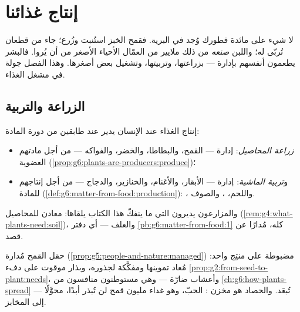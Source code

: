 \chapter{إنتاج غذائنا}\label{ch:g6:producing-our-food}

لا شيء على مائدة فطورك وُجد في البرية. فقمح الخبز استُنبت وزُرع؛
 جاء من قطعان تُربّى له؛ واللبن \emph{صنعه} من ذلك 
ملايير من العمّال الأحياء الأصغر من أن يُروا. فالبشر يطعمون أنفسهم
بإدارة  --- بزراعتها، وتربيتها، وتشغيل بعض أصغرها.
وهذا الفصل جولة في مشغل الغذاء.

\section{الزراعة والتربية}

\begin{definition}\label{def:g6:producing-our-food:farming}
إنتاج الغذاء عند الإنسان يدير  عند طابقين من دورة
المادة:
\begin{itemize}
  \item \emph{زراعة المحاصيل}: إدارة  ---
        القمح، والبطاطا، والخضر، والفواكه --- من أجل مادتهم
        العضوية
        (\cref{prop:g6:plants-are-producers:produce})؛
  \item و\emph{تربية الماشية}: إدارة  ---
        الأبقار، والأغنام، والخنازير، والدجاج --- من أجل إنتاجهم
        للمادة (\cref{def:g6:matter-from-food:production}):
        ، واللحم، ، والصوف.
\end{itemize}
والمزارعون يديرون  التي ما ينفكّ هذا الكتاب يلقاها: معادن
 للمحاصيل (\cref{rem:g4:what-plants-need:soil})، والعلف
 --- أي دفتر \cref{pb:g6:matter-from-food:1} كله، مُدارًا
عن قصد.
\end{definition}

\begin{example}\label{ex:g6:producing-our-food:wheat}
حقل القمح  مُدارة
(\cref{prop:g5:people-and-nature:managed}) مضبوطة على منتِج واحد:
 مُعاد تموينها ومفكَّكة لجذوره، وبذار موقوت على دفء
\cref{prop:g2:from-seed-to-plant:needs}، وأعشاب ضارّة --- وهي
مستوطنون منافسون من \cref{ch:g6:how-plants-spread} --- تُبعَد.
والحصاد هو مخزن  : الحبّ، وهو غداء مليون  قمح لن
تُبذر أبدًا، محوَّلًا إلى المخابز.
\end{example}

